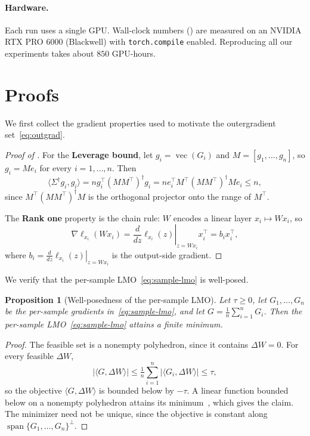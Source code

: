 \documentclass[11pt]{article}
\renewcommand{\vec}{\operatorname{vec}}
\newcommand{\ip}[1]{\langle #1 \rangle}
\theoremstyle{plain}
\newtheorem{proposition}{Proposition}
\theoremstyle{definition}
\theoremstyle{remark}
\theoremstyle{definition}
\begin{document}
\paragraph{Hardware.} Each run uses a single GPU. Wall-clock numbers () are measured on an NVIDIA RTX PRO 6000 (Blackwell) with \texttt{torch.compile} enabled. Reproducing all our experiments takes about $850$ GPU-hours.

\newpage



\section{Proofs}
\label{app:proofs}

We first collect the gradient properties used to motivate the outergradient set~\eqref{eq:outgrad}.
\gradprop*
\begin{proof}[Proof of ]
For the {\bf Leverage bound}, let $g_i=\vec(G_i)$ and
$M=[g_1,\ldots,g_n]$, so $g_i = Me_i$ for every $i =1,\ldots, n$. Then
\[
\ip{\Sigma^\dagger g_i, g_i} = ng_i^\top (MM^\top)^{\dagger} g_i = n e_i^\top M^\top  (MM^\top)^{\dagger} M e_i  \leq n,
\]
since $M^\top  (MM^\top)^{\dagger} M$ is the orthogonal projector onto the range
of $M^\top$.

The {\bf Rank one} property is the chain rule: $W$ encodes a linear layer
$x_i \mapsto W x_i$, so
\[
\nabla \ell_{x_i}(Wx_i) =  \left. \frac{d }{dz} \ell_{x_i}(z)
\right|_{z =Wx_i} x_i^\top
=b_i x_i^\top,
\]
where $b_i = \left.\frac{d }{dz} \ell_{x_i}(z)  \right|_{z =Wx_i}$ is the
output-side gradient.
\end{proof}

We verify that the per-sample LMO~\eqref{eq:sample-lmo} is well-posed.
\begin{proposition}[Well-posedness of the per-sample LMO]
\label{prop:wellposed}
Let $\tau\ge 0$, let $G_1,\dots,G_n$ be the per-sample gradients in~\eqref{eq:sample-lmo}, and let $G=\tfrac1n\sum_{i=1}^n G_i$. Then the per-sample LMO~\eqref{eq:sample-lmo} attains a finite minimum.
\end{proposition}
\begin{proof}
The feasible set is a nonempty polyhedron, since it contains $\Delta W=0$. For every feasible $\Delta W$,
\[
|\ip{G,\Delta W}|\le\tfrac1n\sum_{i=1}^n|\ip{G_i,\Delta W}|\le\tau,
\]
so the objective $\ip{G,\Delta W}$ is bounded below by $-\tau$. A linear function bounded below on a nonempty polyhedron attains its minimum~\cite{bertsimas1997introduction}, which gives the claim. The minimizer need not be unique, since the objective is constant along $\operatorname{span}\{G_1,\ldots,G_n\}^\perp$.
\end{proof}
\end{document}
